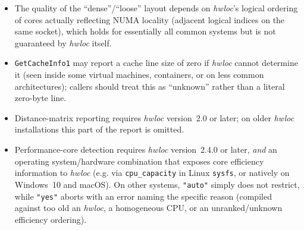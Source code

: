 \begin{itemize}
\item The quality of the ``dense''/``loose'' layout depends on
  \emph{hwloc}'s logical ordering of cores actually reflecting NUMA
  locality (adjacent logical indices on the same socket), which holds
  for essentially all common systems but is not guaranteed by
  \emph{hwloc} itself.
\item \texttt{GetCacheInfo1} may report a cache line size of zero if
  \emph{hwloc} cannot determine it (seen inside some virtual machines,
  containers, or on less common architectures); callers should treat
  this as ``unknown'' rather than a literal zero-byte line.
\item Distance-matrix reporting requires \emph{hwloc} version~2.0 or
  later; on older \emph{hwloc} installations this part of the report is
  omitted.
\item Performance-core detection requires \emph{hwloc} version~2.4.0 or
  later, \emph{and} an operating system/hardware combination that
  exposes core efficiency information to \emph{hwloc} (e.g. via
  \texttt{cpu\_capacity} in Linux \texttt{sysfs}, or natively on
  Windows~10 and macOS). On other systems, \texttt{"auto"} simply does
  not restrict, while \texttt{"yes"} aborts with an error naming the
  specific reason (compiled against too old an \emph{hwloc}, a
  homogeneous CPU, or an unranked/unknown efficiency ordering).


\end{itemize}
